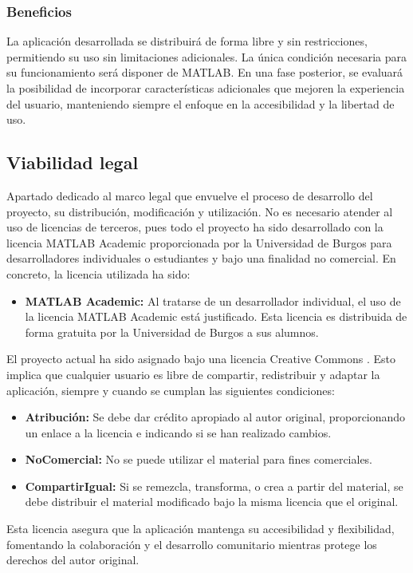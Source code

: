 \subsubsection{Beneficios}\label{beneficios}

La aplicación desarrollada se distribuirá de forma libre y sin restricciones, permitiendo su uso sin limitaciones adicionales. La única condición necesaria para su funcionamiento será disponer de MATLAB. En una fase posterior, se evaluará la posibilidad de incorporar características adicionales que mejoren la experiencia del usuario, manteniendo siempre el enfoque en la accesibilidad y la libertad de uso.

\subsection{Viabilidad legal}\label{viabilidad-legal}

Apartado dedicado al marco legal que envuelve el proceso de desarrollo del proyecto, su distribución, modificación y utilización. No es necesario atender al uso de licencias de terceros, pues todo el proyecto ha sido desarrollado con la licencia MATLAB Academic proporcionada por la Universidad de Burgos para desarrolladores individuales o estudiantes y bajo una finalidad no comercial. En concreto, la licencia utilizada ha sido:

\begin{itemize}
  \item \textbf{MATLAB Academic:} Al tratarse de un desarrollador individual, el uso de la licencia MATLAB Academic está justificado. Esta licencia es distribuida de forma gratuita por la Universidad de Burgos a sus alumnos.
\end{itemize}

El proyecto actual ha sido asignado bajo una licencia Creative Commons \cite{cc4}. Esto implica que cualquier usuario es libre de compartir, redistribuir y adaptar la aplicación, siempre y cuando se cumplan las siguientes condiciones:

\begin{itemize}
  \item \textbf{Atribución:} Se debe dar crédito apropiado al autor original, proporcionando un enlace a la licencia e indicando si se han realizado cambios.
  \item \textbf{NoComercial:} No se puede utilizar el material para fines comerciales.
  \item \textbf{CompartirIgual:} Si se remezcla, transforma, o crea a partir del material, se debe distribuir el material modificado bajo la misma licencia que el original.
\end{itemize}

Esta licencia asegura que la aplicación mantenga su accesibilidad y flexibilidad, fomentando la colaboración y el desarrollo comunitario mientras protege los derechos del autor original.
